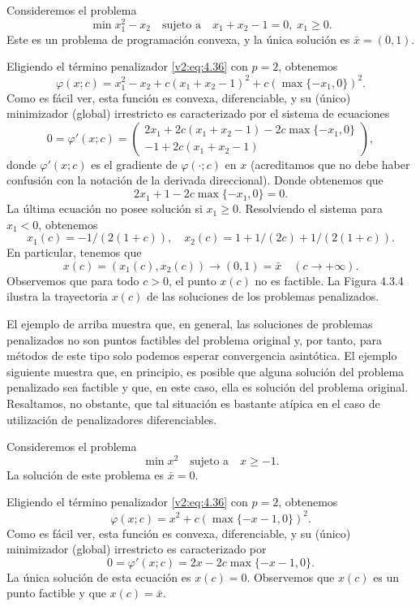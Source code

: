 \begin{example}\label{v2:exa:4.3.1}
    Consideremos el problema
    \[
        \min x_1^2 - x_2 \quad \text{sujeto a} \quad x_1 + x_2 - 1 = 0, \; x_1 \ge 0.
    \]
    Este es un problema de programación convexa, y la única solución es $\bar{x} = (0, 1)$.

    Eligiendo el término penalizador \eqref{v2:eq:4.36} con $p = 2$, obtenemos
    \[
        \varphi(x; c) = x_1^2 - x_2 + c(x_1 + x_2 - 1)^2 + c(\max\{-x_1, 0\})^2.
    \]
    Como es fácil ver, esta función es convexa, diferenciable, y su (único) minimizador (global) irrestricto es caracterizado por el sistema de ecuaciones
    \[
        0 = \varphi'(x; c) = \begin{pmatrix} 2x_1 + 2c(x_1 + x_2 - 1) - 2c\max\{-x_1, 0\} \\ -1 + 2c(x_1 + x_2 - 1) \end{pmatrix},
    \]
    donde $\varphi'(x; c)$ es el gradiente de $\varphi(\cdot; c)$ en $x$ (acreditamos que no debe haber confusión con la notación de la derivada direccional). Donde obtenemos que
    \[
        2x_1 + 1 - 2c\max\{-x_1, 0\} = 0.
    \]
    La última ecuación no posee solución si $x_1 \ge 0$. Resolviendo el sistema para $x_1 < 0$, obtenemos
    \[
        x_1(c) = -1/(2(1+c)), \quad x_2(c) = 1 + 1/(2c) + 1/(2(1+c)).
    \]
    En particular, tenemos que
    \[
        x(c) = (x_1(c), x_2(c)) \to (0, 1) = \bar{x} \quad (c \to +\infty).
    \]
    Observemos que para todo $c > 0$, el punto $x(c)$ no es factible. La Figura 4.3.4 ilustra la trayectoria $x(c)$ de las soluciones de los problemas penalizados.


    El ejemplo de arriba muestra que, en general, las soluciones de problemas penalizados no son puntos factibles del problema original y, por tanto, para métodos de este tipo solo podemos esperar convergencia asintótica. El ejemplo siguiente muestra que, en principio, es posible que alguna solución del problema penalizado sea factible y que, en este caso, ella es solución del problema original. Resaltamos, no obstante, que tal situación es bastante atípica en el caso de utilización de penalizadores diferenciables.
\end{example}

\begin{example}\label{v2:exa:4.3.2}
    Consideremos el problema
    \[
        \min x^2 \quad \text{sujeto a} \quad x \ge -1.
    \]
    La solución de este problema es $\bar{x} = 0$.

    Eligiendo el término penalizador \eqref{v2:eq:4.36} con $p = 2$, obtenemos
    \[
        \varphi(x; c) = x^2 + c(\max\{-x - 1, 0\})^2.
    \]
    Como es fácil ver, esta función es convexa, diferenciable, y su (único) minimizador (global) irrestricto es caracterizado por
    \[
        0 = \varphi'(x; c) = 2x - 2c\max\{-x - 1, 0\}.
    \]
    La única solución de esta ecuación es $x(c) = 0$.
    Observemos que $x(c)$ es un punto factible y que $x(c) = \bar{x}$.
\end{example}


